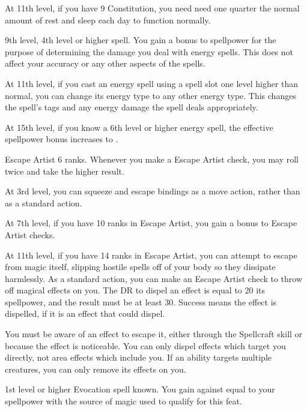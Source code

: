     At 11th level, if you have 9 Constitution, you need need one quarter the normal amount of rest and sleep each day to function normally.

    \featpre 9th level, 4th level or higher  spell.
    \featben You gain a  bonus to spellpower for the purpose of determining the damage you deal with energy spells.
    This does not affect your accuracy or any other aspects of the spells.

    At 11th level, if you cast an energy spell using a spell slot one level higher than normal, you can change its energy type to any other energy type.
    This changes the spell's tags and any energy damage the spell deals appropriately.

    At 15th level, if you know a 6th level or higher energy spell, the effective spellpower bonus increases to .

    \featpre Escape Artist 6 ranks.
    \featben Whenever you make a Escape Artist check, you may roll twice and take the higher result.

    At 3rd level, you can squeeze and escape bindings as a move action, rather than as a standard action.

    At 7th level, if you have 10 ranks in Escape Artist, you gain a  bonus to Escape Artist checks.

    At 11th level, if you have 14 ranks in Escape Artist, you can attempt to escape from magic itself, slipping hostile spells off of your body so they dissipate harmlessly.
    As a standard action, you can make an Escape Artist check to throw off magical effects on you.
    The DR to dispel an effect is equal to 20 \add its spellpower, and the result must be at least 30.
    Success means the effect is dispelled, if it is an effect that  could dispel.
    \magical

    You must be aware of an effect to escape it, either through the Spellcraft skill or because the effect is noticeable.
    You can only dispel effects which target you directly, not area effects which include you.
    If an ability targets multiple creatures, you can only remove its effects on you.

    \featpre 1st level or higher Evocation spell known.
    \featben You gain  against  equal to your spellpower with the source of magic used to qualify for this feat.

